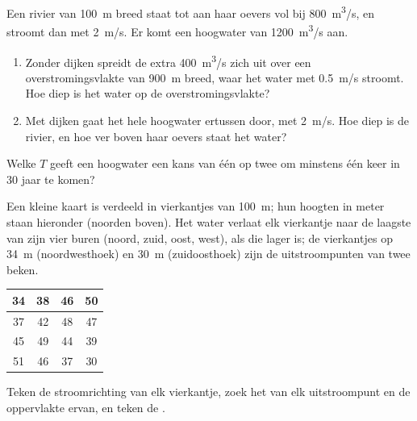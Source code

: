 \begin{exercise}[$\star\star\star$]\label{exo:g10:drainage-basins:13}
Een rivier van \qty{100}{m} breed staat tot aan haar oevers vol bij
\qty{800}{m^3/s}, en stroomt dan met \qty{2}{m/s}. Er komt een hoogwater van
\qty{1200}{m^3/s} aan.
\begin{enumerate}
  \item Zonder dijken spreidt de extra \qty{400}{m^3/s} zich uit over een
        overstromingsvlakte van \qty{900}{m} breed, waar het water met
        \qty{0.5}{m/s} stroomt. Hoe diep is het water op de overstromingsvlakte?
  \item Met dijken gaat het hele hoogwater ertussen door, met \qty{2}{m/s}.
        Hoe diep is de rivier, en hoe ver boven haar oevers staat het water?
\end{enumerate}
\end{exercise}

\begin{exercise}[$\star\star\star$]\label{exo:g10:drainage-basins:14}
Welke  $T$ geeft een hoogwater een kans van één op twee om minstens
één keer in \num{30} jaar te komen?
\end{exercise}

\begin{exercise}[$\star\star\star$]\label{exo:g10:drainage-basins:15}
Een kleine kaart is verdeeld in vierkantjes van \qty{100}{m}; hun hoogten in
meter staan hieronder (noorden boven). Het water verlaat elk vierkantje naar de
laagste van zijn vier buren (noord, zuid, oost, west), als die lager is; de
vierkantjes op \qty{34}{m} (noordwesthoek) en \qty{30}{m} (zuidoosthoek) zijn de
uitstroompunten van twee beken.
\begin{center}
\begin{tabular}{|c|c|c|c|}
\hline
34 & 38 & 46 & 50 \\ \hline
37 & 42 & 48 & 47 \\ \hline
45 & 49 & 44 & 39 \\ \hline
51 & 46 & 37 & 30 \\ \hline
\end{tabular}
\end{center}
Teken de stroomrichting van elk vierkantje, zoek het  van elk
uitstroompunt en de oppervlakte ervan, en teken de .
\end{exercise}


